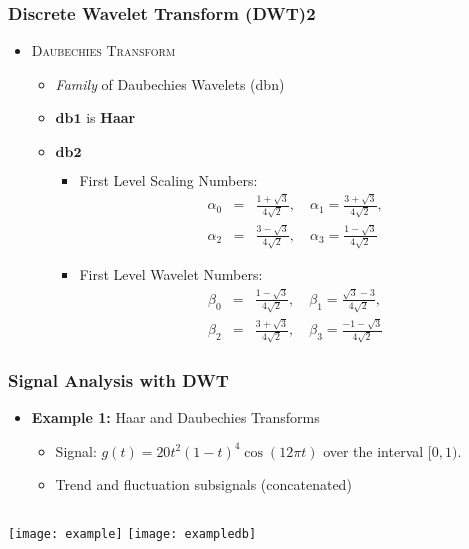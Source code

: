 \documentclass[9pt]{beamer}
\begin{document}
\begin{frame}
\frametitle{Discrete Wavelet Transform (DWT)\hfill{2}}

\begin{itemize} 
\item \textsc{Daubechies Transform}
    \begin{itemize}
    \item \emph{Family} of Daubechies Wavelets (dbn)
    \item $\mathbf{db1}$ is \textbf{Haar}
    \item $\mathbf{db2}$
            \begin{itemize}
            \item First Level Scaling Numbers:
            \begin{eqnarray*}
            \alpha_{0} &=& \frac{1+\sqrt{3}}{4\sqrt{2}}, \quad \alpha_{1}=\frac{3+\sqrt{3}}{4\sqrt{2}}, \\
            \alpha_{2} &=& \frac{3-\sqrt{3}}{4\sqrt{2}}, \quad \alpha_{3}=\frac{1-\sqrt{3}}{4\sqrt{2}}
            \end{eqnarray*}
            \item First Level Wavelet Numbers:
            \begin{eqnarray*}
            \beta_{0} &=& \frac{1-\sqrt{3}}{4\sqrt{2}}, \quad \beta_{1}=\frac{\sqrt{3}-3}{4\sqrt{2}}, \\
            \beta_{2} &=& \frac{3+\sqrt{3}}{4\sqrt{2}}, \quad \beta_{3}=\frac{-1-\sqrt{3}}{4\sqrt{2}}
            \end{eqnarray*}
            \end{itemize}
    \end{itemize}
\end{itemize}
\end{frame}

\begin{frame}
\frametitle{Signal Analysis with DWT}

\begin{itemize} 
\item \textbf{Example 1:} Haar and Daubechies Transforms
    \begin{itemize}
    \item Signal: $g(t)=20t^{2}(1-t)^{4}\cos(12\pi t)$ over the interval $[0,1)$. 
    \item Trend and fluctuation subsignals (concatenated) 
    \end{itemize}
\end{itemize}
 
\begin{columns}
\texttt{[image: example]}
\texttt{[image: exampledb]}
\end{columns}
\end{frame}
\end{document}
